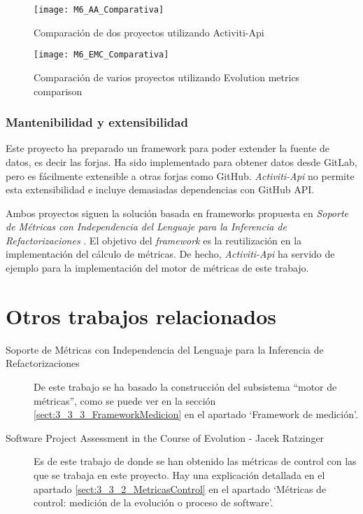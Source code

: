 \begin{figure}[!h]
	\centering
	\texttt{[image: M6\_AA\_Comparativa]}
	\caption{Comparación de dos proyectos utilizando Activiti-Api}\label{fig:M6_AA_Comparativa}
\end{figure}
\FloatBarrier

\begin{figure}[!h]
	\centering
	\texttt{[image: M6\_EMC\_Comparativa]}
	\caption{Comparación de varios proyectos utilizando Evolution metrics comparison}\label{fig:M6_EMC_Comparativa}
\end{figure}
\FloatBarrier


\subsubsection{Mantenibilidad y extensibilidad}

Este proyecto ha preparado un  framework para poder extender la fuente de datos, es decir las forjas. Ha sido implementado para obtener datos desde GitLab, pero es fácilmente extensible a otras forjas como GitHub. \textit{Activiti-Api} no permite esta extensibilidad e incluye demasiadas dependencias con GitHub API.

Ambos proyectos siguen la solución basada en frameworks propuesta en \textit{Soporte de Métricas con Independencia del Lenguaje para la Inferencia de Refactorizaciones} \citep{marticorena_soporte_2005}. El objetivo del \textit{framework} es la reutilización en la implementación del cálculo de métricas. De hecho, \textit{Activiti-Api} ha servido de ejemplo para la implementación del motor de métricas de este trabajo.

\section{Otros trabajos relacionados}
\begin{description}
	\item[Soporte de Métricas con Independencia del Lenguaje para la Inferencia de Refactorizaciones] De este trabajo se ha basado la construcción del subsistema ``motor de métricas'', como se puede ver en la sección \ref{sect:3_3_3_FrameworkMedicion} en el apartado `Framework de medición'.
	
	\item[Software Project Assessment in the Course of Evolution -  Jacek Ratzinger] Es de este trabajo de donde se han obtenido las métricas de control con las que se trabaja en este proyecto. Hay una explicación detallada en el apartado \ref{sect:3_3_2_MetricasControl} en el apartado `Métricas de control: medición de la evolución o proceso de software'.
\end{description}

